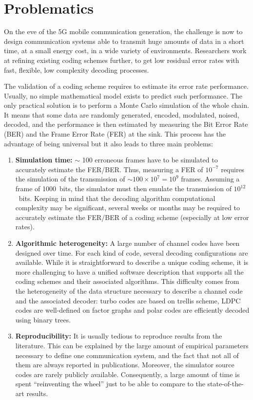 \section{Problematics}

On the eve of the 5G mobile communication generation, the challenge is now to
design communication systems able to transmit huge amounts of data in a short
time, at a small energy cost, in a wide variety of environments. Researchers
work at refining existing coding schemes further, to get low residual error
rates with fast, flexible, low complexity decoding processes.

The validation of a coding scheme requires to estimate its error rate
performance. Usually, no simple mathematical model exists to predict such
performance. The only practical solution is to perform a Monte Carlo simulation
of the whole chain. It means that some data are randomly generated, encoded,
modulated, noised, decoded, and the performance is then estimated by measuring
the Bit Error Rate (BER) and the Frame Error Rate (FER) at the sink. This
process has the advantage of being universal but it also leads to three main
problems:

\begin{enumerate}
  \item \textbf{Simulation time:}
    $\sim$ 100 erroneous frames have to be simulated to accurately estimate the
    FER/BER. Thus, measuring a FER of $10^{-7}$ requires the simulation of the
    transmission of $\sim100\times 10^7=10^9$ frames. Assuming a frame of
    1000~bits, the simulator must then emulate the transmission of
    $10^{12}$~bits. Keeping in mind that the decoding algorithm computational
    complexity may be significant, several weeks or months may be required to
    accurately estimate the FER/BER of a coding scheme (especially at low error
    rates).

  \item \textbf{Algorithmic heterogeneity:} A large number of channel codes have
    been designed over time. For each kind of code, several decoding
    configurations are available. While it is straightforward to describe a
    unique coding scheme, it is more challenging to have a unified software
    description that supports all the coding schemes and their associated
    algorithms. This difficulty comes from the heterogeneity of the data
    structure necessary to describe a channel code and the associated decoder:
    turbo codes are based on trellis scheme, LDPC codes are well-defined on
    factor graphs and polar codes are efficiently decoded using binary trees.

  \item \textbf{Reproducibility:} It is usually tedious to reproduce results
    from the literature. This can be explained by the large amount of empirical
    parameters necessary to define one communication system, and the fact that
    not all of them are always reported in publications. Moreover, the simulator
    source codes are rarely publicly available. Consequently, a large amount of
    time is spent ``reinventing the wheel'' just to be able to compare to the
    state-of-the-art results.
\end{enumerate}

